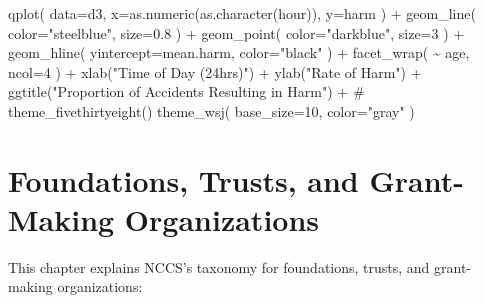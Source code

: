 \documentclass[
  letterpaper,
  DIV=11,
  numbers=noendperiod,
  oneside]{scrreprt}
\newenvironment{Shaded}{\begin{snugshade}}{\end{snugshade}}
\newcommand{\AttributeTok}[1]{\textcolor[rgb]{0.40,0.45,0.13}{#1}}
\newcommand{\CommentTok}[1]{\textcolor[rgb]{0.37,0.37,0.37}{#1}}
\newcommand{\DecValTok}[1]{\textcolor[rgb]{0.68,0.00,0.00}{#1}}
\newcommand{\FloatTok}[1]{\textcolor[rgb]{0.68,0.00,0.00}{#1}}
\newcommand{\FunctionTok}[1]{\textcolor[rgb]{0.28,0.35,0.67}{#1}}
\newcommand{\NormalTok}[1]{\textcolor[rgb]{0.00,0.23,0.31}{#1}}
\newcommand{\SpecialCharTok}[1]{\textcolor[rgb]{0.37,0.37,0.37}{#1}}
\newcommand{\StringTok}[1]{\textcolor[rgb]{0.13,0.47,0.30}{#1}}
\begin{document}
\begin{Shaded}
\begin{Highlighting}[]
\FunctionTok{qplot}\NormalTok{( }\AttributeTok{data=}\NormalTok{d3, }\AttributeTok{x=}\FunctionTok{as.numeric}\NormalTok{(}\FunctionTok{as.character}\NormalTok{(hour)), }\AttributeTok{y=}\NormalTok{harm ) }\SpecialCharTok{+} 
  \FunctionTok{geom\_line}\NormalTok{( }\AttributeTok{color=}\StringTok{"steelblue"}\NormalTok{, }\AttributeTok{size=}\FloatTok{0.8}\NormalTok{ ) }\SpecialCharTok{+} 
  \FunctionTok{geom\_point}\NormalTok{( }\AttributeTok{color=}\StringTok{"darkblue"}\NormalTok{, }\AttributeTok{size=}\DecValTok{3}\NormalTok{ ) }\SpecialCharTok{+} 
  \FunctionTok{geom\_hline}\NormalTok{( }\AttributeTok{yintercept=}\NormalTok{mean.harm, }\AttributeTok{color=}\StringTok{"black"}\NormalTok{ ) }\SpecialCharTok{+} 
  \FunctionTok{facet\_wrap}\NormalTok{( }\SpecialCharTok{\textasciitilde{}}\NormalTok{ age, }\AttributeTok{ncol=}\DecValTok{4}\NormalTok{ ) }\SpecialCharTok{+} 
  \FunctionTok{xlab}\NormalTok{(}\StringTok{"Time of Day (24hrs)"}\NormalTok{) }\SpecialCharTok{+} \FunctionTok{ylab}\NormalTok{(}\StringTok{"Rate of Harm"}\NormalTok{) }\SpecialCharTok{+}
  \FunctionTok{ggtitle}\NormalTok{(}\StringTok{"Proportion of Accidents Resulting in Harm"}\NormalTok{) }\SpecialCharTok{+}
  \CommentTok{\# theme\_fivethirtyeight() }
  \FunctionTok{theme\_wsj}\NormalTok{( }\AttributeTok{base\_size=}\DecValTok{10}\NormalTok{, }\AttributeTok{color=}\StringTok{"gray"}\NormalTok{ )}
\end{Highlighting}
\end{Shaded}


\hypertarget{foundations-trusts-and-grant-making-organizations}{%
\chapter{Foundations, Trusts, and Grant-Making
Organizations}\label{foundations-trusts-and-grant-making-organizations}}

This chapter explains NCCS's taxonomy for foundations, trusts, and
grant-making organizations:
\end{document}
